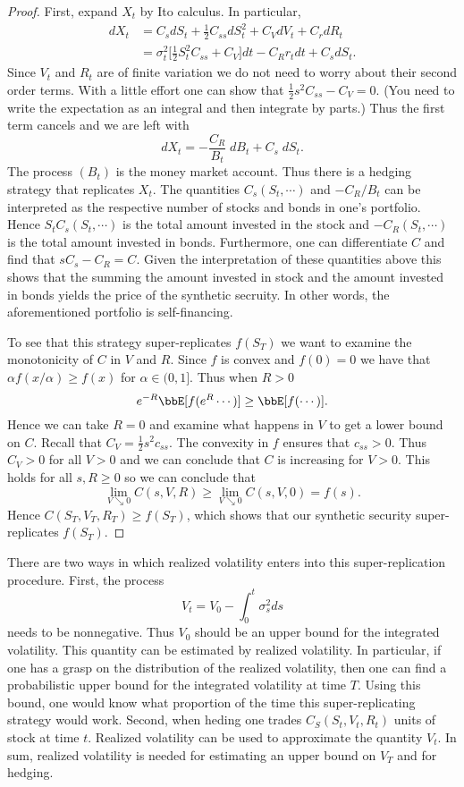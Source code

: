\documentclass{report}
\begin{document}
\begin{proof}
First, expand $X_t$ by Ito calculus.  In particular,
\begin{align*}
dX_t & = C_s dS_t + \frac{1}{2} C_{ss} dS_t^2 + C_V dV_t + C_r dR_t \\
& = \sigma_t^2 \Big[ \frac{1}{2} S_t^2 C_{ss} + C_V \Big] dt - C_R r_t
dt + C_s dS_t.
\end{align*}
Since $V_t$ and $R_t$ are of finite variation we do not need to worry
about their second order terms.  With a little effort one can show
that $\frac{1}{2} s^2 C_{ss} - C_V = 0$.  (You need to write the
expectation as an integral and then integrate by parts.)  Thus the
first term cancels and we are left with
\[
dX_t = - \frac{C_R}{B_t} \; dB_t + C_s \; dS_t.
\]
The process $(B_t)$ is the money market account.  Thus there is a
hedging strategy that replicates $X_t$.  The quantities $C_s(S_t,
\cdots)$ and $-C_R / B_t$ can be interpreted as the respective number
of stocks and bonds in one's portfolio.  Hence $S_t C_s(S_t, \cdots)$
is the total amount invested in the stock and $-C_R(S_t, \cdots)$ is
the total amount invested in bonds.  Furthermore, one can
differentiate $C$ and find that $s C_s - C_R = C$.  Given the
interpretation of these quantities above this shows that the summing
the amount invested in stock and the amount invested in bonds yields
the price of the synthetic secruity.  In other words, the
aforementioned portfolio is self-financing.

To see that this strategy super-replicates $f(S_T)$ we want to examine
the monotonicity of $C$ in $V$ and $R$.  Since $f$ is convex and $f(0)
= 0$ we have that $\alpha f(x/ \alpha) \geq f(x)$ for $\alpha \in
(0,1]$.  Thus when $R > 0$ 
\[
e^{-R} \bbE[ f(e^{R} \cdots) ] \geq \bbE[ f(\cdots) ].
\]
Hence we can take $R = 0$ and examine what happens in $V$ to get a
lower bound on $C$.  Recall that $C_V = \frac{1}{2} s^2 c_{ss}$.  The
convexity in $f$ ensures that $c_{ss} > 0$.  Thus $C_V > 0$ for all $V
> 0$ and we can conclude that $C$ is increasing for $V>0$.  This holds
for all $s, R \geq 0$ so we can conclude that
\[
\lim_{V \searrow 0} C(s, V, R) \geq \lim_{V \searrow 0} C(s,V,0) =
f(s).
\]
Hence $C(S_T, V_T, R_T) \geq f(S_T)$, which shows that our synthetic
security super-replicates $f(S_T)$.
\end{proof}

There are two ways in which realized volatility enters into this
super-replication procedure.  First, the process
\[
V_t = V_0 - \int_0^t \sigma_s^2 ds
\]
needs to be nonnegative.  Thus $V_0$ should be an upper bound for the
integrated volatility.  This quantity can be estimated by realized
volatility.  In particular, if one has a grasp on the distribution of
the realized volatility, then one can find a probabilistic upper bound
for the integrated volatility at time $T$.  Using this bound, one
would know what proportion of the time this super-replicating strategy
would work.  Second, when heding one trades $C_S(S_t, V_t, R_t)$ units
of stock at time $t$.  Realized volatility can be used to approximate
the quantity $V_t$.  In sum, realized volatility is needed for
estimating an upper bound on $V_T$ and for hedging.
\end{document}
